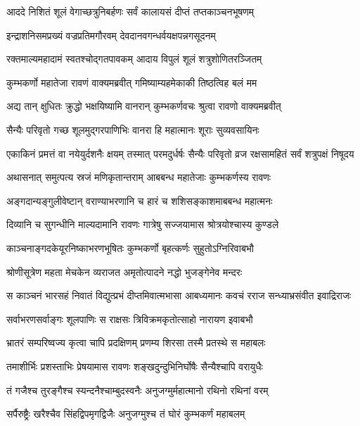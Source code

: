 \twolineshloka
{आददे निशितं शूलं वेगाच्छत्रुनिबर्हणः}
{सर्वं कालायसं दीप्तं तप्तकाञ्चनभूषणम्} %

\twolineshloka
{इन्द्राशनिसमप्रख्यं वज्रप्रतिमगौरवम्}
{देवदानवगन्धर्वयक्षपन्नगसूदनम्} %

\twolineshloka
{रक्तमाल्यमहादामं स्वतश्चोद्गतपावकम्}
{आदाय विपुलं शूलं शत्रुशोणितरञ्जितम्} %

\twolineshloka
{कुम्भकर्णो महातेजा रावणं वाक्यमब्रवीत्}
{गमिष्याम्यहमेकाकी तिष्ठत्विह बलं मम} %

\twolineshloka
{अद्य तान् क्षुधितः क्रुद्धो भक्षयिष्यामि वानरान्}
{कुम्भकर्णवचः श्रुत्वा रावणो वाक्यमब्रवीत्} %

\twolineshloka
{सैन्यैः परिवृतो गच्छ शूलमुद्गरपाणिभिः}
{वानरा हि महात्मानः शूराः सुव्यवसायिनः} %

\threelineshloka
{एकाकिनं प्रमत्तं वा नयेयुर्दशनैः क्षयम्}
{तस्मात् परमदुर्धर्षः सैन्यैः परिवृतो व्रज}
{रक्षसामहितं सर्वं शत्रुपक्षं निषूदय} %

\twolineshloka
{अथासनात् समुत्पत्य स्रजं मणिकृतान्तराम्}
{आबबन्ध महातेजाः कुम्भकर्णस्य रावणः} %

\twolineshloka
{अङ्गदान्यङ्गुलीवेष्टान् वराण्याभरणानि च}
{हारं च शशिसङ्काशमाबबन्ध महात्मनः} %

\twolineshloka
{दिव्यानि च सुगन्धीनि माल्यदामानि रावणः}
{गात्रेषु सज्जयामास श्रोत्रयोश्चास्य कुण्डले} %

\twolineshloka
{काञ्चनाङ्गदकेयूरनिष्काभरणभूषितः}
{कुम्भकर्णो बृहत्कर्णः सुहुतोऽग्निरिवाबभौ} %

\twolineshloka
{श्रोणीसूत्रेण महता मेचकेन व्यराजत}
{अमृतोत्पादने नद्धो भुजङ्गेनेव मन्दरः} %

\twolineshloka
{स काञ्चनं भारसहं निवातं विद्युत्प्रभं दीप्तमिवात्मभासा}
{आबध्यमानः कवचं रराज सन्ध्याभ्रसंवीत इवाद्रिराजः} %

\twolineshloka
{सर्वाभरणसर्वाङ्गः शूलपाणिः स राक्षसः}
{त्रिविक्रमकृतोत्साहो नारायण इवाबभौ} %

\twolineshloka
{भ्रातरं सम्परिष्वज्य कृत्वा चापि प्रदक्षिणम्}
{प्रणम्य शिरसा तस्मै प्रतस्थे स महाबलः} %

\twolineshloka
{तमाशीर्भिः प्रशस्ताभिः प्रेषयामास रावणः}
{शङ्खदुन्दुभिनिर्घोषैः सैन्यैश्चापि वरायुधैः} %

\twolineshloka
{तं गजैश्च तुरङ्गैश्च स्यन्दनैश्चाम्बुदस्वनैः}
{अनुजग्मुर्महात्मानो रथिनो रथिनां वरम्} %

\twolineshloka
{सर्पैरुष्ट्रैः खरैश्चैव सिंहद्विपमृगद्विजैः}
{अनुजग्मुश्च तं घोरं कुम्भकर्णं महाबलम्} %

